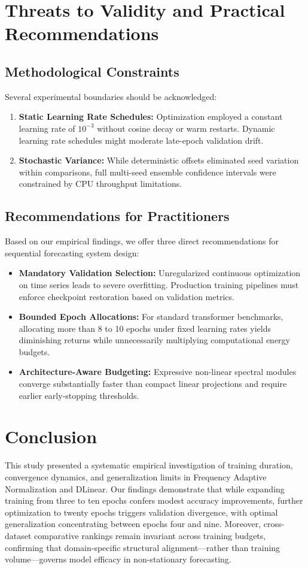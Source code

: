 \documentclass[journal]{IEEEtran}
\begin{document}
\section{Threats to Validity and Practical Recommendations}

\subsection{Methodological Constraints}
Several experimental boundaries should be acknowledged:
\begin{enumerate}
    \item \textbf{Static Learning Rate Schedules:} Optimization employed a constant learning rate of $10^{-3}$ without cosine decay or warm restarts. Dynamic learning rate schedules might moderate late-epoch validation drift.
    \item \textbf{Stochastic Variance:} While deterministic offsets eliminated seed variation within comparisons, full multi-seed ensemble confidence intervals were constrained by CPU throughput limitations.
\end{enumerate}

\subsection{Recommendations for Practitioners}
Based on our empirical findings, we offer three direct recommendations for sequential forecasting system design:
\begin{itemize}
    \item \textbf{Mandatory Validation Selection:} Unregularized continuous optimization on time series leads to severe overfitting. Production training pipelines must enforce checkpoint restoration based on validation metrics.
    \item \textbf{Bounded Epoch Allocations:} For standard transformer benchmarks, allocating more than 8 to 10 epochs under fixed learning rates yields diminishing returns while unnecessarily multiplying computational energy budgets.
    \item \textbf{Architecture-Aware Budgeting:} Expressive non-linear spectral modules converge substantially faster than compact linear projections and require earlier early-stopping thresholds.
\end{itemize}

\section{Conclusion}
This study presented a systematic empirical investigation of training duration, convergence dynamics, and generalization limits in Frequency Adaptive Normalization and DLinear. Our findings demonstrate that while expanding training from three to ten epochs confers modest accuracy improvements, further optimization to twenty epochs triggers validation divergence, with optimal generalization concentrating between epochs four and nine. Moreover, cross-dataset comparative rankings remain invariant across training budgets, confirming that domain-specific structural alignment—rather than training volume—governs model efficacy in non-stationary forecasting.
\end{document}
